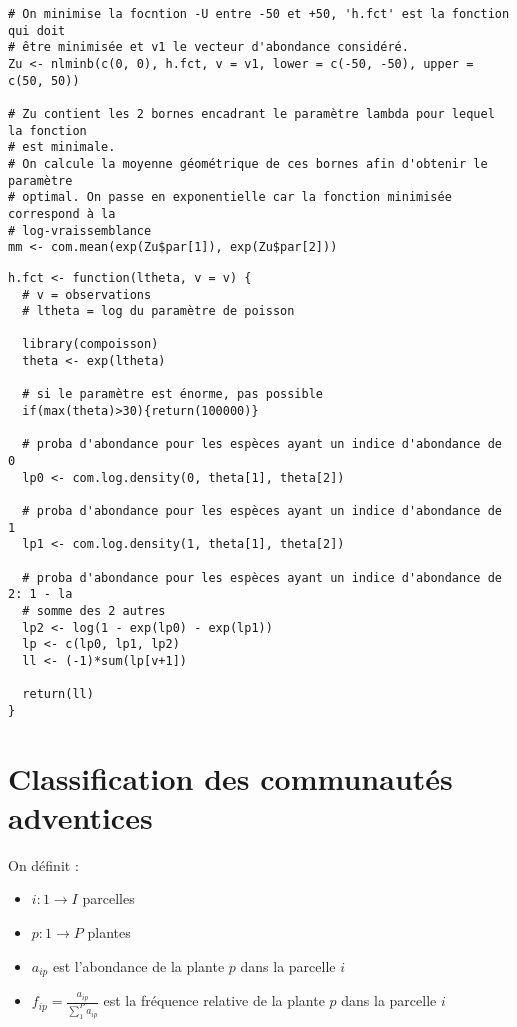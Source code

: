\documentclass[a4paper, 12pt]{article}
\begin{document}
\begin{small}
\begin{verbatim}
# On minimise la focntion -U entre -50 et +50, 'h.fct' est la fonction qui doit
# être minimisée et v1 le vecteur d'abondance considéré.
Zu <- nlminb(c(0, 0), h.fct, v = v1, lower = c(-50, -50), upper = c(50, 50))

# Zu contient les 2 bornes encadrant le paramètre lambda pour lequel la fonction
# est minimale.
# On calcule la moyenne géométrique de ces bornes afin d'obtenir le paramètre
# optimal. On passe en exponentielle car la fonction minimisée correspond à la
# log-vraissemblance
mm <- com.mean(exp(Zu$par[1]), exp(Zu$par[2]))
\end{verbatim}

\begin{verbatim}
h.fct <- function(ltheta, v = v) {
  # v = observations
  # ltheta = log du paramètre de poisson

  library(compoisson)
  theta <- exp(ltheta)

  # si le paramètre est énorme, pas possible
  if(max(theta)>30){return(100000)}

  # proba d'abondance pour les espèces ayant un indice d'abondance de 0
  lp0 <- com.log.density(0, theta[1], theta[2])

  # proba d'abondance pour les espèces ayant un indice d'abondance de 1
  lp1 <- com.log.density(1, theta[1], theta[2])

  # proba d'abondance pour les espèces ayant un indice d'abondance de 2: 1 - la
  # somme des 2 autres
  lp2 <- log(1 - exp(lp0) - exp(lp1))
  lp <- c(lp0, lp1, lp2)
  ll <- (-1)*sum(lp[v+1])

  return(ll)
}
\end{verbatim}
\end{small}

\section{Classification des communautés adventices}

On définit :

\begin{itemize}
  \item $ i : 1 \to I $ parcelles
  \item $ p : 1 \to P $ plantes
  \item $ a_{ip} $ est l'abondance de la plante $p$ dans la parcelle $i$
  \item $f_{ip} = \frac{a_{ip}}{\sum_{1}^{P} a_{ip}}$ est la fréquence relative
    de la plante $p$ dans la parcelle $i$
\end{itemize}
\end{document}
